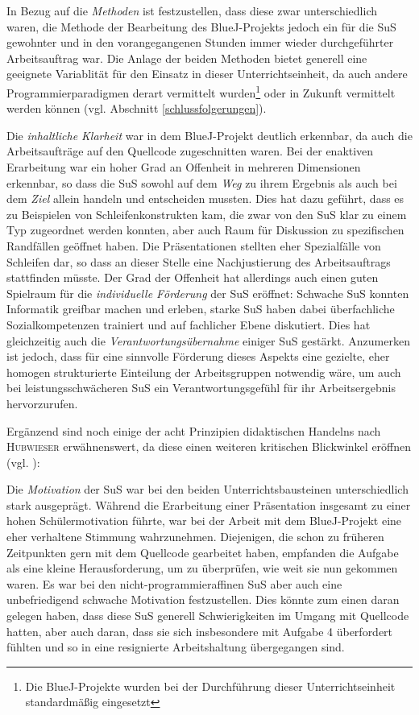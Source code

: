 \documentclass[paper=a4, DIV=13, BCOR=12mm, twoside=on, onecolumn=on, open = any, titlepage =on, parskip =half-, headsepline = on, footsepline = on, chapterprefix = on, sectionprefix = on, appendixprefix = off, fontsize = 11pt, numbers = noenddot, abstract = off]{scrreprt}
\begin{document}
\onehalfspacing

In Bezug auf die \emph{Methoden} ist festzustellen, dass diese zwar unterschiedlich waren, die Methode der Bearbeitung des BlueJ-Projekts jedoch ein für die SuS gewohnter und in den vorangegangenen Stunden immer wieder durchgeführter Arbeitsauftrag war. Die Anlage der beiden Methoden bietet generell eine geeignete Variablität für den Einsatz in dieser Unterrichtseinheit, da auch andere Programmierparadigmen derart vermittelt wurden\footnote{Die BlueJ-Projekte wurden bei der Durchführung dieser Unterrichtseinheit standardmäßig eingesetzt} oder in Zukunft vermittelt werden können (vgl. Abschnitt \ref{schlussfolgerungen}).

Die \emph{inhaltliche Klarheit} war in dem BlueJ-Projekt deutlich erkennbar, da auch die Arbeitsaufträge auf den Quellcode zugeschnitten waren. Bei der enaktiven Erarbeitung war ein hoher Grad an Offenheit in mehreren Dimensionen erkennbar, so dass die SuS sowohl auf dem \emph{Weg} zu ihrem Ergebnis als auch bei dem \emph{Ziel} allein handeln und entscheiden mussten. Dies hat dazu geführt, dass es zu Beispielen von Schleifenkonstrukten kam, die zwar von den SuS klar zu einem Typ zugeordnet werden konnten, aber auch Raum für Diskussion zu spezifischen Randfällen geöffnet haben. Die Präsentationen stellten eher Spezialfälle von Schleifen dar, so dass an dieser Stelle eine Nachjustierung des Arbeitsauftrags stattfinden müsste. Der Grad der Offenheit hat allerdings auch einen guten Spielraum für die \emph{individuelle Förderung} der SuS eröffnet: Schwache SuS konnten Informatik greifbar machen und erleben, starke SuS haben dabei überfachliche Sozialkompetenzen trainiert und auf fachlicher Ebene diskutiert. Dies hat gleichzeitig auch die \emph{Verantwortungsübernahme} einiger SuS gestärkt. Anzumerken ist jedoch, dass für eine sinnvolle Förderung dieses Aspekts eine gezielte, eher homogen strukturierte Einteilung der Arbeitsgruppen notwendig wäre, um auch bei leistungsschwächeren SuS ein Verantwortungsgefühl für ihr Arbeitsergebnis hervorzurufen.

Ergänzend sind noch einige der acht Prinzipien didaktischen Handelns nach \textsc{Hubwieser} erwähnenswert, da diese einen weiteren kritischen Blickwinkel eröffnen (vgl. \cite[S.15ff.]{hubwieser:07}):

Die \emph{Motivation} der SuS war bei den beiden Unterrichtsbausteinen unterschiedlich stark ausgeprägt. Während die Erarbeitung einer Präsentation insgesamt zu einer hohen Schülermotivation führte, war bei der Arbeit mit dem BlueJ-Projekt eine eher verhaltene Stimmung wahrzunehmen. Diejenigen, die schon zu früheren Zeitpunkten gern mit dem Quellcode gearbeitet haben, empfanden die Aufgabe als eine kleine Herausforderung, um zu überprüfen, wie weit sie nun gekommen waren. Es war bei den nicht-programmieraffinen SuS aber auch eine unbefriedigend schwache Motivation festzustellen. Dies könnte zum einen daran gelegen haben, dass diese SuS generell Schwierigkeiten im Umgang mit Quellcode hatten, aber auch daran, dass sie sich insbesondere mit Aufgabe 4 überfordert fühlten und so in eine resignierte Arbeitshaltung übergegangen sind. 
\end{document}
